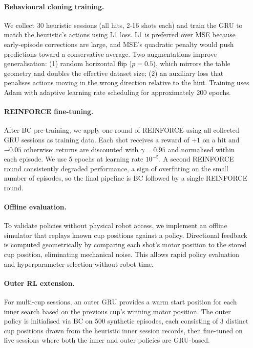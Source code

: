 \documentclass[twoside,11pt]{article}
\begin{document}
\paragraph{Behavioural cloning training.}
We collect 30 heuristic sessions (all hits, 2-16 shots each) and train the GRU
to match the heuristic's actions using L1 loss. L1 is preferred over MSE
because early-episode corrections are large, and MSE's quadratic penalty would
push predictions toward a conservative average. Two augmentations improve
generalisation: (1) random horizontal flip ($p{=}0.5$), which mirrors the table
geometry and doubles the effective dataset size; (2) an auxiliary loss that
penalises actions moving in the wrong direction relative to the hint. Training
uses Adam with adaptive learning rate scheduling for approximately 200 epochs.

\paragraph{REINFORCE fine-tuning.}
After BC pre-training, we apply one round of REINFORCE using all collected GRU
sessions as training data. Each shot receives a reward of $+1$ on a hit and
$-0.05$ otherwise; returns are discounted with $\gamma{=}0.95$ and normalised
within each episode. We use 5 epochs at learning rate $10^{-5}$. A second
REINFORCE round consistently degraded performance, a sign of overfitting on the
small number of episodes, so the final pipeline is BC followed by a single
REINFORCE round.

\paragraph{Offline evaluation.}
To validate policies without physical robot access, we implement an offline
simulator that replays known cup positions against a policy. Directional
feedback is computed geometrically by comparing each shot's motor position to
the stored cup position, eliminating mechanical noise. This allows rapid policy
evaluation and hyperparameter selection without robot time.

\paragraph{Outer RL extension.}
For multi-cup sessions, an outer GRU provides a warm start position for each
inner search based on the previous cup's winning motor position. The outer
policy is initialised via BC on 500 synthetic episodes, each consisting of 3
distinct cup positions drawn from the heuristic inner session records, then
fine-tuned on live sessions where both the inner and outer policies are
GRU-based.
\end{document}
